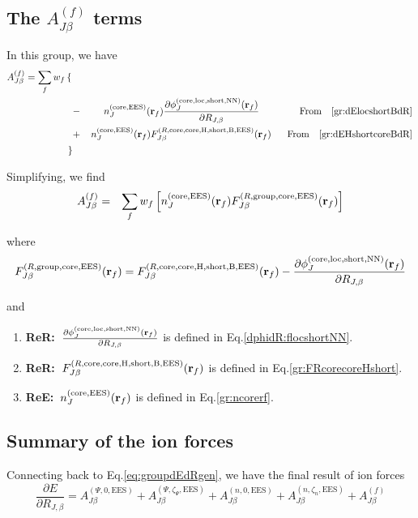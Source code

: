 \documentclass[paper=a4, fontsize=11pt]{article} %
\numberwithin{equation}{section} %
\numberwithin{figure}{section} %
\numberwithin{table}{section} %
\newcommand{\p}{\partial}
\newcommand{\br}{{\bf{r}}}
\newcommand{\rEES}{{\mathrm{EES}}}
\newcommand{\rgr}{{\mathrm{group}}}
\newcommand{\rcore}{{\mathrm{core}}}
\newcommand{\rNN}{{\mathrm{NN}}}
\newcommand{\rshort}{{\mathrm{short}}}
\newcommand{\rH}{{\mathrm{H}}}
\newcommand{\rB}{{\mathrm{B}}}
\newcommand{\rlo}{{\mathrm{loc}}}
\newcommand{\RJb}{{R_{J,\beta}}}
\newcommand{\fr}{{\nonumber \ \ \ \ \ \mathrm{From}\ \ \ }}
\newcommand{\ReE}{{{\bf ReE:\ }}}
\newcommand{\ReR}{{{\bf ReR:\ }}}
\begin{document}
\subsection{The $A_{J\beta}^{(f)}$ terms}

In this group, we have
\begin{eqnarray}
A_{J\beta}^{(f)} = 
 \sum_f w_f \left\{ \right. &&  \nonumber \\
&-&\left.  n_{J}^{(\rcore,\rEES)}(\br_f) \frac{\p \phi_J^{(\rcore,\rlo,\rshort,\rNN)}(\br_f)}{\p \RJb} \hspace*{0.35in} \fr \eqref{gr:dElocshortBdR} \right. \\
&+& \left.  n_{J}^{(\rcore,\rEES)}(\br_f) F_{J\beta}^{(R,\rcore,\rcore,\rH,\rshort,\rB,\rEES)}(\br_f) \fr \eqref{gr:dEHshortcoreBdR} \right. \\
\left. \right\} &&
\end{eqnarray}

Simplifying, we find
\begin{eqnarray}\label{gr:AJbf}
A_{J\beta}^{(f)} &=& \sum_f w_f \left[  n_{J}^{(\rcore,\rEES)}(\br_f) F_{J\beta}^{(R,\rgr,\rcore,\rEES)}(\br_f) \right]
\end{eqnarray}

where
\begin{equation}
F_{J\beta}^{(R,\rgr,\rcore,\rEES)}(\br_f) = F_{J\beta}^{(R,\rcore,\rcore,\rH,\rshort,\rB,\rEES)}(\br_f) - \frac{\p \phi_J^{(\rcore,\rlo,\rshort,\rNN)}(\br_f)}{\p \RJb}
\end{equation}

and
\begin{enumerate}
\item \ReR $\frac{\p \phi_J^{(\rcore,\rlo,\rshort,\rNN)}(\br_f)}{\p \RJb}$ is defined in Eq.\eqref{dphidR:flocshortNN}.
\item \ReR $F_{J\beta}^{(R,\rcore,\rcore,\rH,\rshort,\rB,\rEES)}(\br_f)$ is defined in Eq.\eqref{gr:FRcorecoreHshort}.
\item \ReE $n_{J}^{(\rcore,\rEES)}(\br_f)$ is defined in Eq.\eqref{gr:ncorerf}.
\end{enumerate}




\subsection{Summary of the ion forces}
Connecting back to Eq.\eqref{eq:groupdEdRgen}, we have the final result of ion forces
\begin{equation}
\frac{\p E}{\p \RJb} = A_{J\beta}^{(\Psi,0,\rEES)}+ A_{J\beta}^{(\Psi,\zeta_\Psi,\rEES)}+ A_{J\beta}^{(n,0,\rEES)}+ A_{J\beta}^{(n,\zeta_n,\rEES)}+ A_{J\beta}^{(f)}
\end{equation}
\end{document}
